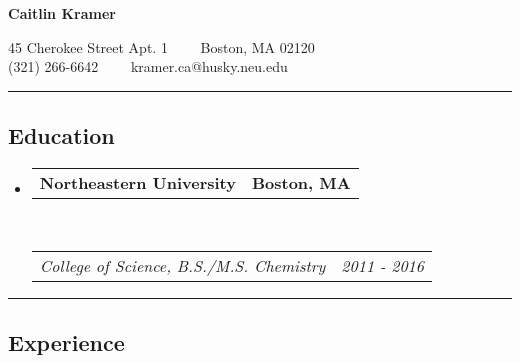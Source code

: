 \documentclass[10pt,letterpaper]{article}
\makeatletter
\newcommand{\headerrow}[2]
{\begin{tabular*}{\linewidth}{l@{\extracolsep{\fill}}r}
  #1 &
  #2 \\
\end{tabular*}}
\makeatother
\begin{document}
\begin{center}
{\LARGE \textbf{Caitlin Kramer}}

45 Cherokee Street Apt. 1\ \ \textbullet
\ \ Boston, MA 02120
\\
(321) 266-6642\ \ \textbullet
\ \ kramer.ca@husky.neu.edu
\end{center}


\hrule
\vspace{-0.4em}
\subsection*{Education}

\begin{itemize}
  \parskip=0.1em

  \item
  \headerrow
      {\textbf{Northeastern University}}
      {\textbf{Boston, MA}}
  \\
  \headerrow
      {\emph{College of Science, B.S./M.S. Chemistry}}
      {\emph{2011 - 2016}}

\end{itemize}

\hrule
\vspace{-0.4em}
\subsection*{Experience}
\end{document}
